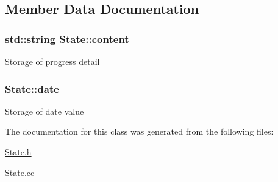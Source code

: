 \subsection{Member Data Documentation}
\hypertarget{classState_a571e4d3107736dc2074ab985cff9ad20}{
\subsubsection[{content}]{\setlength{\rightskip}{0pt plus 5cm}std\-::string State\-::content\hspace{0.3cm}{\ttfamily [private]}}}\label{classState_a571e4d3107736dc2074ab985cff9ad20}
Storage of progress detail \hypertarget{classState_aa84f5430996a657c5658791b556fb8db}{
\subsubsection[{date}]{ State\-::date\hspace{0.3cm}{\ttfamily [private]}}}\label{classState_aa84f5430996a657c5658791b556fb8db}
Storage of date value 

The documentation for this class was generated from the following files\-:\begin{DoxyCompactItemize}
\item 
\hyperlink{State_8h}{State.\-h}\item 
\hyperlink{State_8cc}{State.\-cc}\end{DoxyCompactItemize}
